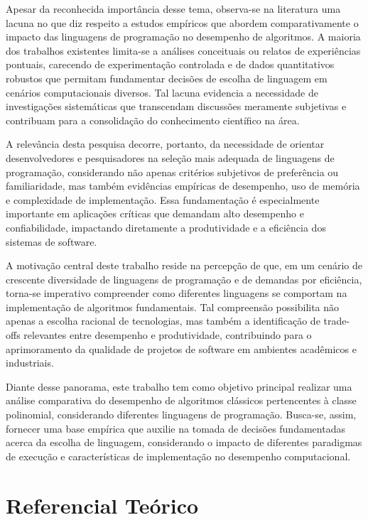 \documentclass[12pt, a4paper]{article}
\begin{document}
Apesar da reconhecida importância desse tema, observa-se na literatura uma lacuna no que diz respeito a estudos empíricos que abordem comparativamente o impacto das linguagens de programação no desempenho de algoritmos. A maioria dos trabalhos existentes limita-se a análises conceituais ou relatos de experiências pontuais, carecendo de experimentação controlada e de dados quantitativos robustos que permitam fundamentar decisões de escolha de linguagem em cenários computacionais diversos. Tal lacuna evidencia a necessidade de investigações sistemáticas que transcendam discussões meramente subjetivas e contribuam para a consolidação do conhecimento científico na área.

A relevância desta pesquisa decorre, portanto, da necessidade de orientar desenvolvedores e pesquisadores na seleção mais adequada de linguagens de programação, considerando não apenas critérios subjetivos de preferência ou familiaridade, mas também evidências empíricas de desempenho, uso de memória e complexidade de implementação. Essa fundamentação é especialmente importante em aplicações críticas que demandam alto desempenho e confiabilidade, impactando diretamente a produtividade e a eficiência dos sistemas de software.

A motivação central deste trabalho reside na percepção de que, em um cenário de crescente diversidade de linguagens de programação e de demandas por eficiência, torna-se imperativo compreender como diferentes linguagens se comportam na implementação de algoritmos fundamentais. Tal compreensão possibilita não apenas a escolha racional de tecnologias, mas também a identificação de trade-offs relevantes entre desempenho e produtividade, contribuindo para o aprimoramento da qualidade de projetos de software em ambientes acadêmicos e industriais.

Diante desse panorama, este trabalho tem como objetivo principal realizar uma análise comparativa do desempenho de algoritmos clássicos pertencentes à classe polinomial, considerando diferentes linguagens de programação. Busca-se, assim, fornecer uma base empírica que auxilie na tomada de decisões fundamentadas acerca da escolha de linguagem, considerando o impacto de diferentes paradigmas de execução e características de implementação no desempenho computacional.

\section{Referencial Teórico}
\end{document}
